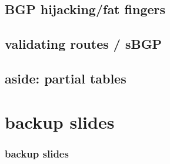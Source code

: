\subsection{BGP hijacking/fat fingers}


\subsection{validating routes / sBGP}



\subsection{aside: partial tables}




\section{backup slides}
\begin{frame}\frametitle{backup slides}
\end{frame}


